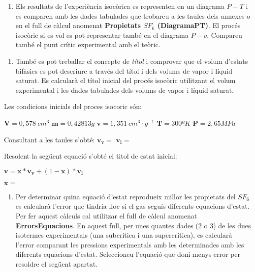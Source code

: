 \documentclass[a4paper]{article}
\begin{document}
\begin{enumerate}[resume]
    \item Els resultats de l’experiència isocòrica es representen en un diagrama $P-T$ i es comparen amb les dades tabulades que trobareu a les taules dels annexes o en el full de càlcul anomenat \textbf{Propietats $SF_6$ (DiagramaPT)}. El procés isocòric si es vol es pot representar també en el diagrama $P-v$. Compareu també el punt crític experimental amb el teòric.
\end{enumerate}

\begin{enumerate}[resume]
    \item També es pot treballar el concepte de \emph{títol} i comprovar que el volum d’estats bifàsics es pot descriure a través del títol i dels volums de vapor i líquid saturat. Es calcularà el títol inicial del procés isocòric utilitzant el volum experimental i les dades tabulades dels volums de vapor i líquid saturat.
\end{enumerate}
Les condicions inicials del proces isocoric són:
		
	$\boldsymbol{V} = 0,578\ cm^3$	
	$\boldsymbol{m} = 0,42813 g$	
	$\boldsymbol{v} = 1,351\ cm^3·g^{-1}$	
	$\boldsymbol{T} = 300 ºK$	
	$\boldsymbol{P} = 2,65 MPa$
	
	Consultant a les taules s'obté:
	$\boldsymbol{v_v} =  $
	$\boldsymbol{v_l} = $
	
	Resolent la següent equació s'obté el titol de estat inicial:
	
	$\boldsymbol{v} = \boldsymbol{x}* \boldsymbol{v_v} + (1- \boldsymbol{x}) * \boldsymbol{v_l}$
	
	$\boldsymbol{x} = $
	
	

\begin{enumerate}[resume]
    \item Per determinar quina equació d’estat reprodueix millor les propietats del $SF_6$ es calcularà l’error que tindria lloc si el gas seguís diferents equacions d’estat. Per fer aquest càlculs cal utilitzar el full de càlcul anomenat \textbf{ErrorsEquacions}. En aquest full, per unes quantes dades (2 o 3) de les dues isotermes experimentals (una subcrítica i una supercrítica), es calcularà l’error comparant les pressions experimentals amb les determinades amb les diferents equacions d’estat. Seleccioneu l’equació que doni menys error per resoldre el següent apartat.
\end{enumerate}
\end{document}
